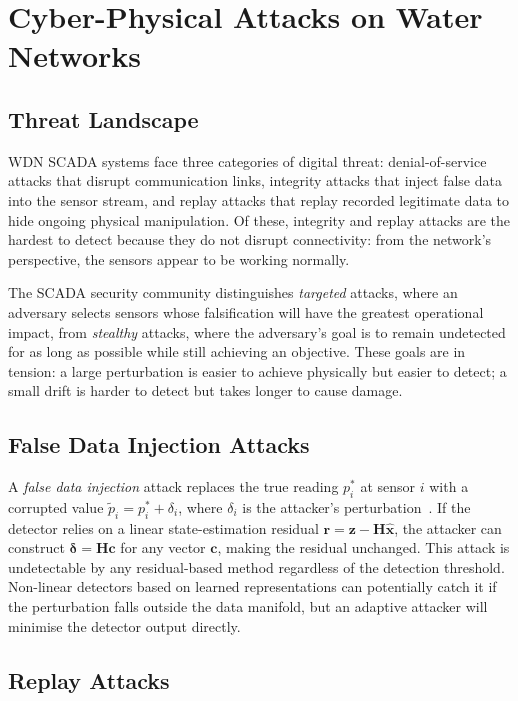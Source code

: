 \section{Cyber-Physical Attacks on Water Networks}
\label{sec:attack_background}

\subsection{Threat Landscape}

WDN SCADA systems face three categories of
digital threat: denial-of-service attacks that disrupt communication
links, integrity attacks that inject false data into the sensor
stream, and replay attacks that replay recorded legitimate data to
hide ongoing physical manipulation. Of these, integrity and replay
attacks are the hardest to detect because they do not disrupt
connectivity: from the network's perspective, the sensors appear to
be working normally.

The SCADA security community distinguishes \emph{targeted}
attacks, where an adversary selects sensors whose falsification
will have the greatest operational impact, from \emph{stealthy}
attacks, where the adversary's goal is to remain undetected for as
long as possible while still achieving an objective. These goals are
in tension: a large perturbation is easier to achieve physically but
easier to detect; a small drift is harder to detect but takes longer
to cause damage.

\subsection{False Data Injection Attacks}

A \emph{false data injection} attack replaces the true reading
$p_i^*$ at sensor $i$ with a corrupted value
$\tilde{p}_i = p_i^* + \delta_i$, where $\delta_i$ is the attacker's
perturbation~\cite{liu2011false}. If the detector relies on a linear
state-estimation residual $\mathbf{r} = \mathbf{z} - \mathbf{H}\hat{\mathbf{x}}$,
the attacker can construct $\boldsymbol{\delta} = \mathbf{H}\mathbf{c}$
for any vector $\mathbf{c}$, making the residual unchanged. This
attack is undetectable by any residual-based method regardless of
the detection threshold. Non-linear detectors based on learned
representations can potentially catch it if the perturbation falls
outside the data manifold, but an adaptive attacker will minimise
the detector output directly.

\subsection{Replay Attacks}

